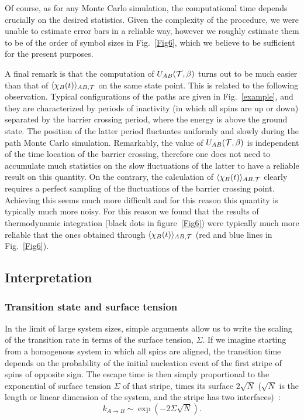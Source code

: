 \documentclass[aps,twocolumn,floats,pre,amsmath,superscriptaddress]{revtex4}
\newcommand{\beq}{\begin{equation}}
\newcommand{\eeq}{\end{equation}}
\def\TT{{\cal T}}\def\NN{{\cal N}} \def\BB{{\cal B}}\def\II{{\cal I}}
\def\to{\rightarrow} \def\la{\langle} \def\ra{\rangle}
\newcommand{\<}{\langle}
\renewcommand{\>}{\rangle}
\begin{document}
Of course, as for any Monte Carlo simulation, 
the computational time depends crucially on the desired statistics.
Given the complexity of the procedure, we were unable to estimate error bars in a reliable way,
however we roughly estimate them to be of the order of symbol sizes in Fig.~\ref{Fig6}, which
we believe to be sufficient for the present purposes.

A final remark is that the computation of $U_{AB}(\TT,\b)$ turns out to be much easier than
that of $\la \chi_B(t) \ra_{AB,\TT}$ on the same state point. This is related to the following
observation. Typical configurations of the paths are given in Fig.~\ref{example}, and they are
characterized by periods of inactivity (in which all spins are up or down) separated by
the barrier crossing period, where the energy is above the ground state. The position of the latter
period fluctuates uniformly and slowly during the path Monte Carlo simulation. Remarkably, the value
of $U_{AB}(\TT,\b)$ is independent of the time location of the barrier crossing, therefore one does
not need to accumulate much statistics on the slow fluctuations of the latter to have a reliable result
on this quantity.
On the contrary, the calculation of $\la \chi_B(t) \ra_{AB,\TT}$ clearly requires a perfect sampling
of the fluctuations of the barrier crossing point. Achieving this seems much more difficult and for
this reason this quantity is typically much more noisy. 
For this reason we found that the results of thermodynamic integration (black dots in figure~\ref{Fig6})
were typically much more reliable that the ones obtained through $\la \chi_B(t) \ra_{AB,\TT}$ (red and blue
lines in Fig.~\ref{Fig6}).




\subsection{Interpretation}\label{Asymscaling}

\subsubsection{Transition state and surface tension}



In the limit of large system sizes, simple arguments allow us to
write the scaling of the transition rate in terms of the surface tension,
$\Sigma$. If we imagine starting from a homogenous system in which all
spins are aligned, the transition time depends on the probability of the
initial nucleation event of the first stripe of spins of opposite
sign. The escape time is then simply proportional to the exponential
of surface tension $\Sigma$ of that stripe, times its surface
$2\sqrt{N}$ ($\sqrt{N}$ is the length or linear dimension of the system, and the stripe
has two interfaces)~\cite{martinelli}:
\beq
k_{A\to B} \sim \exp(-2 \Sigma \sqrt{N} ).
\label{gap}
\eeq
\end{document}
